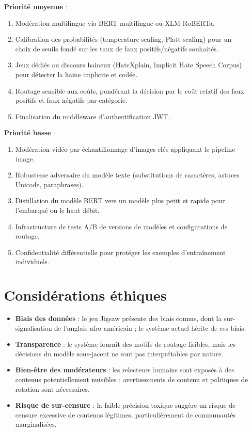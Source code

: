 \textbf{Priorité moyenne} :
\begin{enumerate}[nosep]
  \item Modération multilingue via BERT multilingue ou XLM-RoBERTa.
  \item Calibration des probabilités (temperature scaling, Platt scaling) pour un choix de seuils fondé sur les taux de faux positifs/négatifs souhaités.
  \item Jeux dédiés au discours haineux (HateXplain, Implicit Hate Speech Corpus) pour détecter la haine implicite et codée.
  \item Routage sensible aux coûts, pondérant la décision par le coût relatif des faux positifs et faux négatifs par catégorie.
  \item Finalisation du middleware d'authentification JWT.
\end{enumerate}

\textbf{Priorité basse} :
\begin{enumerate}[nosep]
  \item Modération vidéo par échantillonnage d'images clés appliquant le pipeline image.
  \item Robustesse adversaire du modèle texte (substitutions de caractères, astuces Unicode, paraphrases).
  \item Distillation du modèle BERT vers un modèle plus petit et rapide pour l'embarqué ou le haut débit.
  \item Infrastructure de tests A/B de versions de modèles et configurations de routage.
  \item Confidentialité différentielle pour protéger les exemples d'entraînement individuels.
\end{enumerate}

\section{Considérations éthiques}

\begin{itemize}[nosep]
  \item \textbf{Biais des données} : le jeu Jigsaw présente des biais connus, dont la sur-signalisation de l'anglais afro-américain ; le système actuel hérite de ces biais.
  \item \textbf{Transparence} : le système fournit des motifs de routage lisibles, mais les décisions du modèle sous-jacent ne sont pas interprétables par nature.
  \item \textbf{Bien-être des modérateurs} : les relecteurs humains sont exposés à des contenus potentiellement nuisibles ; avertissements de contenu et politiques de rotation sont nécessaires.
  \item \textbf{Risque de sur-censure} : la faible précision toxique suggère un risque de censure excessive de contenus légitimes, particulièrement de communautés marginalisées.
\end{itemize}
